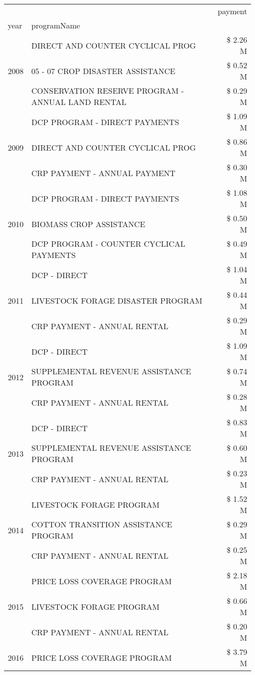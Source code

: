 \begin{tabular}{llr}
\toprule
 &  & payment \\
year & programName &  \\
\midrule
\multirow[t]{3}{*}{2008} & DIRECT AND COUNTER CYCLICAL PROG & \$ 2.26 M \\
 & 05 - 07 CROP DISASTER ASSISTANCE & \$ 0.52 M \\
 & CONSERVATION RESERVE PROGRAM - ANNUAL LAND RENTAL & \$ 0.29 M \\
\cline{1-3}
\multirow[t]{3}{*}{2009} & DCP PROGRAM - DIRECT PAYMENTS & \$ 1.09 M \\
 & DIRECT AND COUNTER CYCLICAL PROG & \$ 0.86 M \\
 & CRP PAYMENT - ANNUAL PAYMENT & \$ 0.30 M \\
\cline{1-3}
\multirow[t]{3}{*}{2010} & DCP PROGRAM - DIRECT PAYMENTS & \$ 1.08 M \\
 & BIOMASS CROP ASSISTANCE & \$ 0.50 M \\
 & DCP PROGRAM - COUNTER CYCLICAL PAYMENTS & \$ 0.49 M \\
\cline{1-3}
\multirow[t]{3}{*}{2011} & DCP - DIRECT & \$ 1.04 M \\
 & LIVESTOCK FORAGE DISASTER PROGRAM & \$ 0.44 M \\
 & CRP PAYMENT - ANNUAL RENTAL & \$ 0.29 M \\
\cline{1-3}
\multirow[t]{3}{*}{2012} & DCP - DIRECT & \$ 1.09 M \\
 & SUPPLEMENTAL REVENUE ASSISTANCE PROGRAM & \$ 0.74 M \\
 & CRP PAYMENT - ANNUAL RENTAL & \$ 0.28 M \\
\cline{1-3}
\multirow[t]{3}{*}{2013} & DCP - DIRECT & \$ 0.83 M \\
 & SUPPLEMENTAL REVENUE ASSISTANCE PROGRAM & \$ 0.60 M \\
 & CRP PAYMENT - ANNUAL RENTAL & \$ 0.23 M \\
\cline{1-3}
\multirow[t]{3}{*}{2014} & LIVESTOCK FORAGE PROGRAM & \$ 1.52 M \\
 & COTTON TRANSITION ASSISTANCE PROGRAM & \$ 0.29 M \\
 & CRP PAYMENT - ANNUAL RENTAL & \$ 0.25 M \\
\cline{1-3}
\multirow[t]{3}{*}{2015} & PRICE LOSS COVERAGE PROGRAM & \$ 2.18 M \\
 & LIVESTOCK FORAGE PROGRAM & \$ 0.66 M \\
 & CRP PAYMENT - ANNUAL RENTAL & \$ 0.20 M \\
\cline{1-3}
\multirow[t]{3}{*}{2016} & PRICE LOSS COVERAGE PROGRAM                   & \$ 3.79 M \\

\end{tabular}
